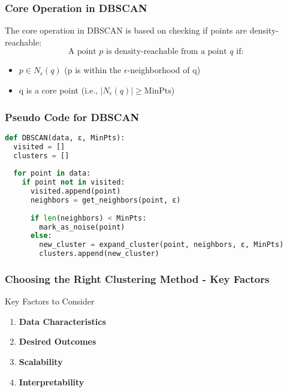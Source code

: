 \documentclass[aspectratio=169]{beamer}
\begin{document}
\begin{frame}[fragile]
    \frametitle{Core Operation in DBSCAN}
    The core operation in DBSCAN is based on checking if points are density-reachable:
    \begin{equation}
        \text{A point } p \text{ is density-reachable from a point } q \text{ if:}
    \end{equation}
    \begin{itemize}
        \item $p \in N_{\epsilon}(q)$ (p is within the $\epsilon$-neighborhood of q)
        \item q is a core point (i.e., $|N_{\epsilon}(q)| \geq \text{MinPts}$)
    \end{itemize}
\end{frame}

\begin{frame}[fragile]
    \frametitle{Pseudo Code for DBSCAN}
    \begin{lstlisting}[language=Python]
def DBSCAN(data, ε, MinPts):
  visited = []
  clusters = []
  
  for point in data:
    if point not in visited:
      visited.append(point)
      neighbors = get_neighbors(point, ε)
      
      if len(neighbors) < MinPts:
        mark_as_noise(point)
      else:
        new_cluster = expand_cluster(point, neighbors, ε, MinPts)
        clusters.append(new_cluster)
    \end{lstlisting}
\end{frame}

\begin{frame}[fragile]
    \frametitle{Choosing the Right Clustering Method - Key Factors}
    \begin{block}{Key Factors to Consider}
        \begin{enumerate}
            \item \textbf{Data Characteristics}
            \item \textbf{Desired Outcomes}
            \item \textbf{Scalability}
            \item \textbf{Interpretability}
        \end{enumerate}
    \end{block}
\end{frame}
\end{document}
